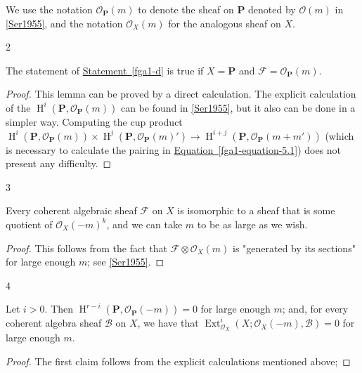   We use the notation \(\mathcal {O}_\mathbf {P}(m)\) to denote the sheaf on \(\mathbf {P}\) denoted by \(\mathcal {O}(m)\) in \hyperref[Ser1955]{[Ser1955]}, and the notation \(\mathcal {O}_X(m)\) for the analogous sheaf on \(X\).\begin{lemma}{2}\label{fga1-lemma-2}\skipsinglepar\par{}The statement of \hyperref[fga1-d]{Statement~\ref*{fga1-d}} is true if \(X=\mathbf {P}\) and \(\mathscr {F}=\mathcal {O}_\mathbf {P}(m)\).\begin{proof}\par{}This lemma can be proved by a direct calculation.
      The explicit calculation of the \(\operatorname {H}^i(\mathbf {P},\mathcal {O}_\mathbf {P}(m))\) can be found in \hyperref[Ser1955]{[Ser1955]}, but it also can be done in a simpler way.
      Computing the cup product \(\operatorname {H}^i(\mathbf {P},\mathcal {O}_\mathbf {P}(m))\times \operatorname {H}^j(\mathbf {P},\mathcal {O}_\mathbf {P}(m)') \to  \operatorname {H}^{i+j}(\mathbf {P},\mathcal {O}_\mathbf {P}(m+m'))\) (which is necessary to calculate the pairing in \hyperref[fga1-equation-5.1]{Equation~\ref*{fga1-equation-5.1}}) does not present any difficulty.\end{proof}\end{lemma}\begin{lemma}{3}\label{fga1-lemma-3}\skipsinglepar\par{}Every coherent algebraic sheaf \(\mathscr {F}\) on \(X\) is isomorphic to a sheaf that is some quotient of \(\mathcal {O}_X(-m)^k\), and we can take \(m\) to be as large as we wish.\begin{proof}\par{}This follows from the fact that \(\mathscr {F}\otimes \mathcal {O}_X(m)\) is "generated by its sections" for large enough \(m\);
      see \hyperref[Ser1955]{[Ser1955]}.\end{proof}\end{lemma}\begin{lemma}{4}\label{fga1-lemma-4}\skipsinglepar\par{}Let \(i>0\).
    Then \(\operatorname {H}^{r-i}(\mathbf {P},\mathcal {O}_\mathbf {P}(-m))=0\) for large enough \(m\);
    and, for every coherent algebra sheaf \(\mathscr {B}\) on \(X\), we have that \(\operatorname {Ext}_{\mathcal {O}_X}^i(X;\mathcal {O}_X(-m),\mathscr {B})=0\) for large enough \(m\).\begin{proof}\par{}The first claim follows from the explicit calculations mentioned above;

\end{proof}
\end{lemma}
